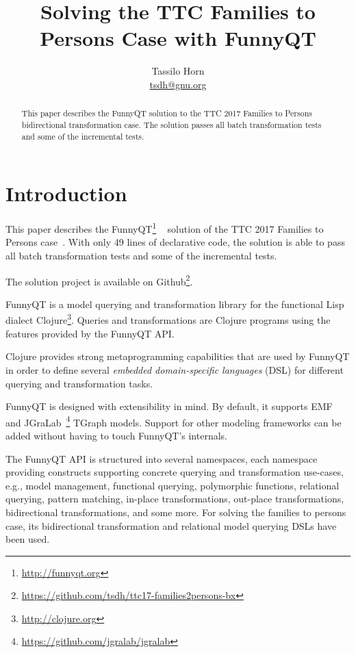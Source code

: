\documentclass[a4paper]{article}
\title{Solving the TTC Families to Persons Case with FunnyQT}
\author{Tassilo Horn\\ \href{mailto:tsdh@gnu.org}{tsdh@gnu.org}}
\begin{document}
\maketitle

\begin{abstract}
  This paper describes the FunnyQT solution to the TTC 2017 Families to Persons
  bidirectional transformation case.  The solution passes all batch
  transformation tests and some of the incremental tests.
\end{abstract}


\section{Introduction}
\label{sec:introduction}

This paper describes the FunnyQT\footnote{\url{http://funnyqt.org}}
~\cite{diss,funnyqt-icgt15} solution of the TTC 2017 Families to Persons
case~\cite{f2p-case-desc}.  With only 49 lines of declarative code, the
solution is able to pass all batch transformation tests and some of the
incremental tests.

The solution project is available on
Github\footnote{\url{https://github.com/tsdh/ttc17-families2persons-bx}}.


FunnyQT is a model querying and transformation library for the functional Lisp
dialect Clojure\footnote{\url{http://clojure.org}}.  Queries and
transformations are Clojure programs using the features provided by the FunnyQT
API.

Clojure provides strong metaprogramming capabilities that are used by FunnyQT
in order to define several \emph{embedded domain-specific languages} (DSL) for
different querying and transformation tasks.

FunnyQT is designed with extensibility in mind.  By default, it supports
EMF~\cite{Steinberg2008EEM} and
JGraLab~\footnote{\url{https://github.com/jgralab/jgralab}} TGraph models.
Support for other modeling frameworks can be added without having to touch
FunnyQT's internals.

The FunnyQT API is structured into several namespaces, each namespace providing
constructs supporting concrete querying and transformation use-cases, e.g.,
model management, functional querying, polymorphic functions, relational
querying, pattern matching, in-place transformations, out-place
transformations, bidirectional transformations, and some more.  For solving the
families to persons case, its bidirectional transformation and relational model
querying DSLs have been used.
\end{document}
